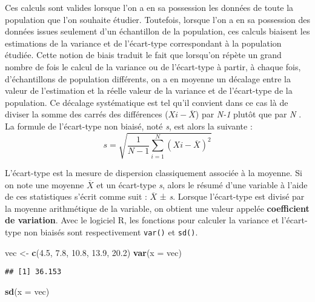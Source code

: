 \documentclass[
  french,
]{book}
\newenvironment{Shaded}{\begin{snugshade}}{\end{snugshade}}
\newcommand{\DataTypeTok}[1]{\textcolor[rgb]{0.13,0.29,0.53}{#1}}
\newcommand{\FloatTok}[1]{\textcolor[rgb]{0.00,0.00,0.81}{#1}}
\newcommand{\KeywordTok}[1]{\textcolor[rgb]{0.13,0.29,0.53}{\textbf{#1}}}
\newcommand{\NormalTok}[1]{#1}
\newcommand{\StringTok}[1]{\textcolor[rgb]{0.31,0.60,0.02}{#1}}
\begin{document}
Ces calculs sont valides lorsque l'on a en sa possession les données de toute la population que l'on souhaite étudier. Toutefois, lorsque l'on a en sa possession des données issues seulement d'un échantillon de la population, ces calculs biaisent les estimations de la variance et de l'écart-type correspondant à la population étudiée. Cette notion de biais traduit le fait que lorsqu'on répète un grand nombre de fois le calcul de la variance ou de l'écart-type à partir, à chaque fois, d'échantillons de population différents, on a en moyenne un décalage entre la valeur de l'estimation et la réelle valeur de la variance et de l'écart-type de la population. Ce décalage systématique est tel qu'il convient dans ce cas là de diviser la somme des carrés des différences (\(X{i} - \overline{X}\)) par \emph{N-1} plutôt que par \emph{N} \autocite{grenierQuelleEstBonne2007}. La formule de l'écart-type non biaisé, noté \emph{s}, est alors la suivante :
\[s = \sqrt{\frac{1}{N-1}\sum_{i=1}^{N} (X{i} - \overline{X})^2}\]

L'écart-type est la mesure de dispersion classiquement associée à la moyenne. Si on note une moyenne \(\overline{X}\) et un écart-type \emph{s}, alors le résumé d'une variable à l'aide de ces statistiques s'écrit comme suit : \(\overline{X}\) ± \emph{s}. Lorsque l'écart-type est divisé par la moyenne arithmétique de la variable, on obtient une valeur appelée \textbf{coefficient de variation}. Avec le logiciel R, les fonctions pour calculer la variance et l'écart-type non biaisés sont respectivement \texttt{var()} et \texttt{sd()}.

\begin{Shaded}
\begin{Highlighting}[]
\NormalTok{vec <-}\StringTok{ }\KeywordTok{c}\NormalTok{(}\FloatTok{4.5}\NormalTok{, }\FloatTok{7.8}\NormalTok{, }\FloatTok{10.8}\NormalTok{, }\FloatTok{13.9}\NormalTok{, }\FloatTok{20.2}\NormalTok{)}
\KeywordTok{var}\NormalTok{(}\DataTypeTok{x =}\NormalTok{ vec)}
\end{Highlighting}
\end{Shaded}

\begin{verbatim}
## [1] 36.153
\end{verbatim}

\begin{Shaded}
\begin{Highlighting}[]
\KeywordTok{sd}\NormalTok{(}\DataTypeTok{x =}\NormalTok{ vec)}
\end{Highlighting}
\end{Shaded}
\end{document}
